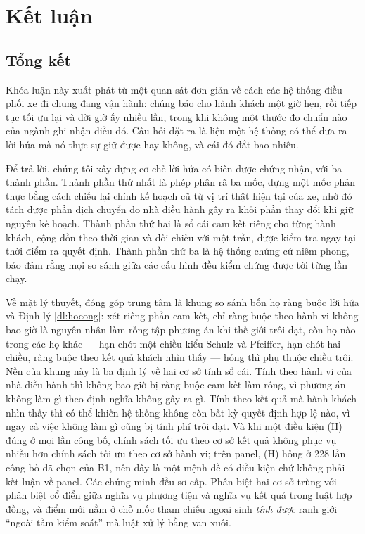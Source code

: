 \chapter{Kết luận}

\section{Tổng kết}

Khóa luận này xuất phát từ một quan sát đơn giản về cách các hệ thống điều phối xe đi chung
đang vận hành: chúng báo cho hành khách một giờ hẹn, rồi tiếp tục tối ưu lại và dời giờ ấy nhiều
lần, trong khi không một thước đo chuẩn nào của ngành ghi nhận điều đó. Câu hỏi đặt ra là liệu
một hệ thống có thể đưa ra lời hứa mà nó thực sự giữ được hay không, và cái đó đắt bao nhiêu.

Để trả lời, chúng tôi xây dựng cơ chế lời hứa có biên được chứng nhận, với ba thành phần. Thành
phần thứ nhất là phép phân rã ba mốc, dựng một mốc phản thực bằng cách chiếu lại chính kế hoạch
cũ từ vị trí thật hiện tại của xe, nhờ đó tách được phần dịch chuyển do nhà điều hành gây ra
khỏi phần thay đổi khi giữ nguyên kế hoạch. Thành phần thứ hai là sổ cái cam kết riêng cho từng hành
khách, cộng dồn theo thời gian và đối chiếu với một trần, được kiểm tra ngay tại thời điểm ra
quyết định. Thành phần thứ ba là hệ thống chứng cứ niêm phong, bảo đảm rằng mọi so sánh giữa
các cấu hình đều kiểm chứng được tới từng lần chạy.

Về mặt lý thuyết, đóng góp trung tâm là khung so sánh bốn họ ràng buộc lời hứa và Định lý
\ref{dl:hocong}: xét riêng phần cam kết, chỉ ràng buộc theo hành vi không bao giờ là nguyên nhân
làm rỗng tập phương án khi thế giới trôi dạt, còn họ nào trong các họ khác --- hạn chót một chiều
kiểu Schulz và Pfeiffer, hạn chót hai chiều, ràng buộc theo kết quả khách nhìn thấy --- hỏng thì
phụ thuộc chiều trôi. Nền của khung này là ba định lý về hai cơ sở tính sổ cái. Tính theo hành vi
của nhà điều hành thì không bao giờ bị ràng buộc cam kết làm rỗng, vì phương án không làm gì theo
định nghĩa không gây ra gì. Tính theo kết quả mà hành khách nhìn thấy thì có thể khiến hệ thống
không còn bất kỳ quyết định hợp lệ nào, vì ngay cả việc không làm gì cũng bị tính phí trôi dạt.
Và khi một điều kiện (H) đúng ở mọi lần công bố, chính sách tối ưu theo cơ sở kết quả không phục
vụ nhiều hơn chính sách tối ưu theo cơ sở hành vi; trên panel, (H) hỏng ở 228 lần công bố đã chọn
của B1, nên đây là một mệnh đề có điều kiện chứ không phải kết luận về panel. Các chứng minh đều
sơ cấp.
Phân biệt hai cơ sở trùng với phân biệt cổ điển giữa nghĩa vụ phương tiện và nghĩa vụ kết quả trong
luật hợp đồng, và điểm mới nằm ở chỗ mốc tham chiếu ngoại sinh \emph{tính được} ranh giới ``ngoài
tầm kiểm soát'' mà luật xử lý bằng văn xuôi.

